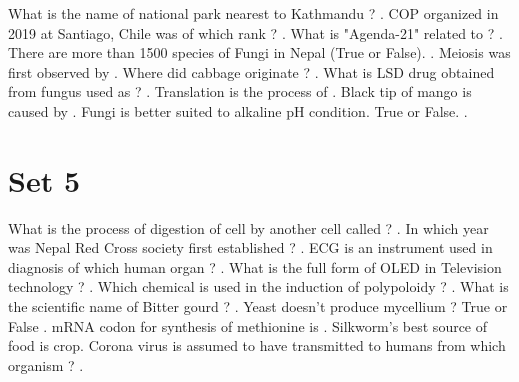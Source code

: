 \documentclass[10pt,a4paper,answers]{exam}
\begin{document}
\begin{questions}
\question What is the name of national park nearest to Kathmandu ? .
\question COP organized in 2019 at Santiago, Chile was of which rank ? \fillin[25th][3cm]. 
\question What is "Agenda-21" related to ? .
\question There are more than 1500 species of Fungi in Nepal (True or False). \fillin[True][3cm].
\question Meiosis was first observed by .
\question Where did cabbage originate ? .
\question What is LSD drug obtained from fungus used as ? \fillin[Stimulant][3cm].
\question Translation is the process of .
\question Black tip of mango is caused by .
\question Fungi is better suited to alkaline pH condition. True or False. \fillin[False][5cm].
\end{questions}

\section*{Set 5}
\begin{questions}
\question What is the process of digestion of cell by another cell called ? \fillin[Phagocytosis][3cm].
\question In which year was Nepal Red Cross society first established ? \fillin[2020 BS][3cm].
\question ECG is an instrument used in diagnosis of which human organ ? \fillin[Heart][3cm].
\question What is the full form of OLED in Television technology ? .
\question Which chemical is used in the induction of polypoloidy ? \fillin[Colchicine][3cm].
\question What is the scientific name of Bitter gourd ? .
\question Yeast doesn't produce mycellium ? True or False \fillin[True][3cm].
\question mRNA codon for synthesis of methionine is \fillin[AUG][3cm].
\question Silkworm's best source of food is \fillin[Mulberry][3cm] crop.
\question Corona virus is assumed to have transmitted to humans from which organism ? \fillin[Bat][3cm].
\end{questions}
\end{document}
